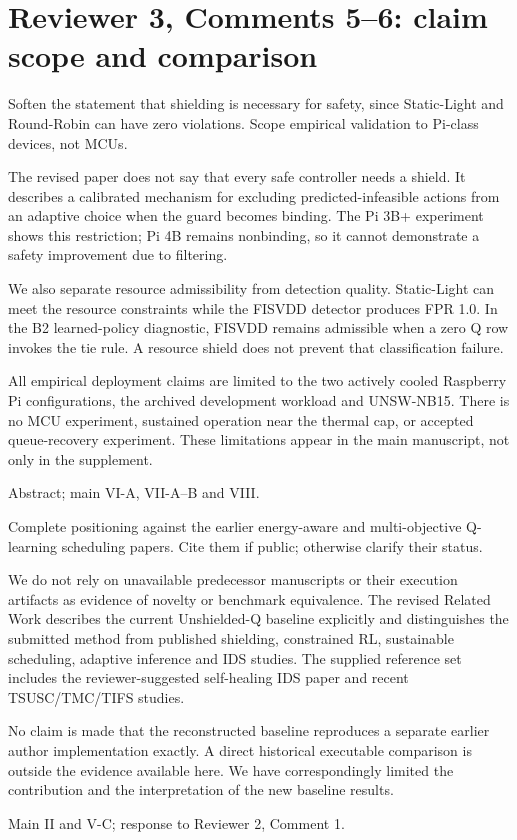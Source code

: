 \documentclass[10pt,a4paper]{article}
\newcommand{\commentbox}[1]{\begin{rcommentbox}#1\end{rcommentbox}}
\newcommand{\responsebox}[1]{\begin{authorresponsebox}#1\end{authorresponsebox}}
\newcommand{\changebox}[1]{\begin{wherebox}#1\end{wherebox}}
\begin{document}
\clearpage
\section*{Reviewer 3, Comments 5--6: claim scope and comparison}
\commentbox{Soften the statement that shielding is necessary for safety, since Static-Light and Round-Robin can have zero violations. Scope empirical validation to Pi-class devices, not MCUs.}
\responsebox{The revised paper does not say that every safe controller needs a shield. It describes a calibrated mechanism for excluding predicted-infeasible actions from an adaptive choice when the guard becomes binding. The Pi 3B+ experiment shows this restriction; Pi 4B remains nonbinding, so it cannot demonstrate a safety improvement due to filtering.

We also separate resource admissibility from detection quality. Static-Light can meet the resource constraints while the FISVDD detector produces FPR 1.0. In the B2 learned-policy diagnostic, FISVDD remains admissible when a zero Q row invokes the tie rule. A resource shield does not prevent that classification failure.

All empirical deployment claims are limited to the two actively cooled Raspberry Pi configurations, the archived development workload and UNSW-NB15. There is no MCU experiment, sustained operation near the thermal cap, or accepted queue-recovery experiment. These limitations appear in the main manuscript, not only in the supplement.}
\changebox{Abstract; main VI-A, VII-A--B and VIII.}
\commentbox{Complete positioning against the earlier energy-aware and multi-objective Q-learning scheduling papers. Cite them if public; otherwise clarify their status.}
\responsebox{We do not rely on unavailable predecessor manuscripts or their execution artifacts as evidence of novelty or benchmark equivalence. The revised Related Work describes the current Unshielded-Q baseline explicitly and distinguishes the submitted method from published shielding, constrained RL, sustainable scheduling, adaptive inference and IDS studies. The supplied reference set includes the reviewer-suggested self-healing IDS paper and recent TSUSC/TMC/TIFS studies.

No claim is made that the reconstructed baseline reproduces a separate earlier author implementation exactly. A direct historical executable comparison is outside the evidence available here. We have correspondingly limited the contribution and the interpretation of the new baseline results.}
\changebox{Main II and V-C; response to Reviewer 2, Comment 1.}
\end{document}
